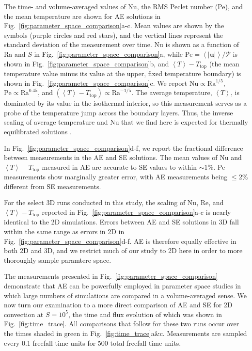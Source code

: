 \documentclass[aps, pre, onecolumn, nofootinbib, notitlepage, groupedaddress, amsfonts, amssymb, amsmath, longbibliography]{revtex4-1}
\newcommand{\angles}[1]{\ensuremath{\left\langle #1 \right\rangle}}
\begin{document}
The time- and volume-averaged values of Nu, the RMS
Peclet number (Pe), and the mean temperature 
are shown for AE solutions in Fig.~\ref{fig:parameter_space_comparison}a-c.
Mean values are shown by the symbols (purple circles and red stars), and 
the vertical lines represent the standard deviation of the measurement over time.
Nu is shown as a function of Ra and $S$ in 
Fig.~\ref{fig:parameter_space_comparison}a, while 
$\text{Pe} = \angles{|\bm{u}|} / \mathcal{P}$ is shown in 
Fig.~\ref{fig:parameter_space_comparison}b, and $\angles{T} - T_{\text{top}}$ 
(the mean temperature value minus its value at the upper, 
fixed temperature boundary) is shown in Fig.~\ref{fig:parameter_space_comparison}c.
We report $\text{Nu} \propto \text{Ra}^{1/5}$,
$\text{Pe} \propto \text{Ra}^{0.45}$, and 
$(\angles{T} - T_{\text{top}}) \propto \text{Ra}^{-1/5}$.
The average temperature, $\angles{T}$, 
is dominated by its value in the isothermal interior,
so this measurement serves as a probe of the temperature jump across the boundary
layers. Thus, the inverse scaling of average temperature and Nu that we
find here is expected for thermally equilibrated solutions \cite{otero&all2002}.

In Fig.~\ref{fig:parameter_space_comparison}d-f, we report the fractional difference
between measurements in the AE and SE solutions.
The mean values of Nu and $\angles{T} - T_{\text{top}}$ 
measured in AE are accurate to SE values to within $\sim 1$\%.
Pe measurements show marginally greater error, with AE measurements being 
$\leq 2$\% different from SE measurements.

For the select 3D runs conducted in this study, the scaling of Nu, Re, and $\angles{T} - T_{\text{top}}$
reported in Fig.~\ref{fig:parameter_space_comparison}a-c is nearly identical to the
2D simulations. Errors between AE and SE solutions in 3D fall within the same range as
errors in 2D in Fig.~\ref{fig:parameter_space_comparison}d-f. AE is therefore
equally effective in both 2D and 3D, and we restrict much of our study to 2D here
in order to more thoroughly sample paramtere space.

The measurements presented in Fig.~\ref{fig:parameter_space_comparison} demonstrate
that AE can be powerfully employed in parameter space studies in which
large numbers of simulations are compared in a volume-averaged sense.  We now turn
our examination to a more direct comparison of AE and SE for 2D convection at
$S = 10^5$, the time and flux evolution of which was shown in Fig.~\ref{fig:time_trace}.
All comparisons that follow for these two runs occur over the times shaded in
green in Fig.~\ref{fig:time_trace}a\&c. Measurements are sampled every
0.1 freefall time units for 500 total freefall time units.
\end{document}
